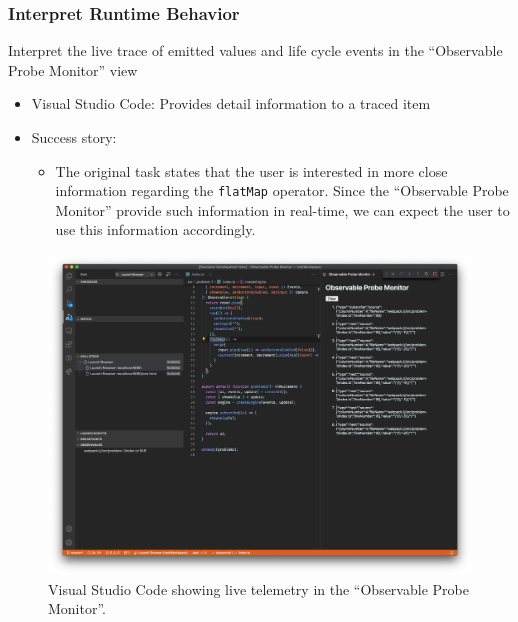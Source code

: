 \documentclass[sigplan,screen,nonacm,review]{acmart}
\begin{document}
\subsubsection{Interpret Runtime Behavior}
Interpret the live trace of emitted values and life cycle events in the ``Observable Probe Monitor'' view

\begin{itemize}
	\item Visual Studio Code: Provides detail information to a traced item
	\item Success story:
	      \begin{itemize}
	      	\item The original task states that the user is interested in more close information regarding the \texttt{flatMap} operator. Since the ``Observable Probe Monitor'' provide such information in real-time, we can expect the user to use this information accordingly.
	      \end{itemize}
\end{itemize}

\begin{figure}[ht]
	\centering
	\includegraphics[width=\columnwidth]{walkthrough-screenshots/step8.png}
	\Description{}
	\caption{Visual Studio Code showing live telemetry in the ``Observable Probe Monitor''.}
	\label{fig:walkthrough-screesnhot-step-8}
\end{figure}
\end{document}
